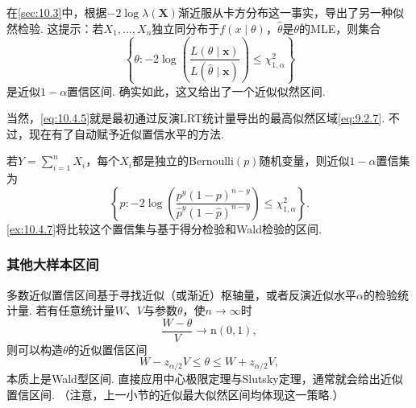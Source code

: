 在\autoref{sec:10.3}中，根据$-2\log\lambda(\boldsymbol X)$渐近服从卡方分布这一事实，导出了另一种似然检验. 这提示：若$X_1,\ldots,X_n$独立同分布于$f(x\mid\theta)$，$\hat\theta$是$\theta$的MLE，则集合
\begin{equation}\label{eq:10.4.5}
\left\{\theta:-2\log\left(\frac{L(\theta\mid\boldsymbol x)}{L(\hat\theta\mid\boldsymbol x)}\right)\leq\chi_{1,\alpha}^2\right\}
\end{equation}
是近似$1-\alpha$置信区间. 确实如此，这又给出了一个近似似然区间.

当然，\eqref{eq:10.4.5}就是最初通过反演LRT统计量导出的最高似然区域\eqref{eq:9.2.7}. 不过，现在有了自动赋予近似置信水平的方法.

\begin{example}[二项LRT区间]\label{ex:10.4.3}
若$Y=\sum_{i=1}^nX_i$，每个$X_i$都是独立的Bernoulli$(p)$随机变量，则近似$1-\alpha$置信集为
$$\left\{p:-2\log\left(\frac{p^y(1-p)^{n-y}}{\hat p^y(1-\hat p)^{n-y}}\right)\leq\chi_{1,\alpha}^2\right\}.$$
\autoref{ex:10.4.7}将比较这个置信集与基于得分检验和Wald检验的区间.
\end{example}

\subsubsection{其他大样本区间}\label{sec:10.4.2}
多数近似置信区间基于寻找近似（或渐近）枢轴量，或者反演近似水平$\alpha$的检验统计量. 若有任意统计量$W$、$V$与参数$\theta$，使$n\to\infty$时
$$\frac{W-\theta}V\longrightarrow\mathrm n(0,1),$$
则可以构造$\theta$的近似置信区间
$$W-z_{\alpha/2}V\leq\theta\leq W+z_{\alpha/2}V,$$
本质上是Wald型区间. 直接应用中心极限定理与Slutsky定理，通常就会给出近似置信区间. （注意，上一小节的近似最大似然区间均体现这一策略.）

